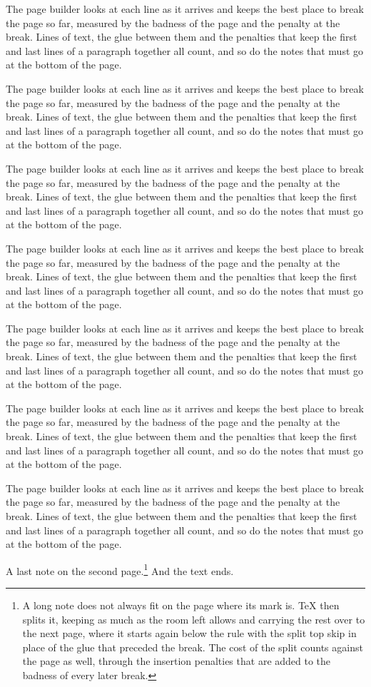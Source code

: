 \documentclass{article}
\begin{document}
The page builder looks at each line as it arrives and keeps the best place to break the page so far, measured by the badness of the page and the penalty at the break. Lines of text, the glue between them and the penalties that keep the first and last lines of a paragraph together all count, and so do the notes that must go at the bottom of the page.

The page builder looks at each line as it arrives and keeps the best place to break the page so far, measured by the badness of the page and the penalty at the break. Lines of text, the glue between them and the penalties that keep the first and last lines of a paragraph together all count, and so do the notes that must go at the bottom of the page.

The page builder looks at each line as it arrives and keeps the best place to break the page so far, measured by the badness of the page and the penalty at the break. Lines of text, the glue between them and the penalties that keep the first and last lines of a paragraph together all count, and so do the notes that must go at the bottom of the page.

The page builder looks at each line as it arrives and keeps the best place to break the page so far, measured by the badness of the page and the penalty at the break. Lines of text, the glue between them and the penalties that keep the first and last lines of a paragraph together all count, and so do the notes that must go at the bottom of the page.

The page builder looks at each line as it arrives and keeps the best place to break the page so far, measured by the badness of the page and the penalty at the break. Lines of text, the glue between them and the penalties that keep the first and last lines of a paragraph together all count, and so do the notes that must go at the bottom of the page.

The page builder looks at each line as it arrives and keeps the best place to break the page so far, measured by the badness of the page and the penalty at the break. Lines of text, the glue between them and the penalties that keep the first and last lines of a paragraph together all count, and so do the notes that must go at the bottom of the page.

The page builder looks at each line as it arrives and keeps the best place to break the page so far, measured by the badness of the page and the penalty at the break. Lines of text, the glue between them and the penalties that keep the first and last lines of a paragraph together all count, and so do the notes that must go at the bottom of the page.

A last note on the second page.\footnote{A long note does not always fit on the page where its mark is. TeX then splits it, keeping as much as the room left allows and carrying the rest over to the next page, where it starts again below the rule with the split top skip in place of the glue that preceded the break. The cost of the split counts against the page as well, through the insertion penalties that are added to the badness of every later break.} And the text ends.
\end{document}
